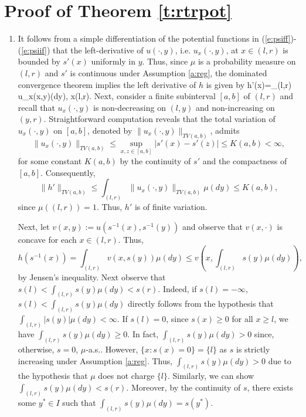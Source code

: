 \documentclass[11pt,reqno]{amsart}
\numberwithin{equation}{section}
\begin{document}
\section{Proof of Theorem \ref{t:rtrpot}}
	\begin{enumerate}[leftmargin=*]
		\item It follows from a simple differentiation of the potential functions in  (\ref{e:psiff})-(\ref{e:psiif}) that the left-derivative of $u(\cdot, y)$, i.e. $u_x(\cdot,y)$, at $x \in (l,r)$ is bounded by $s'(x)$ uniformly in $y$. Thus, since $\mu$ is a probability measure on $(l,r)$ and $s'$ is continuous under Assumption \ref{a:reg}, the dominated convergence theorem implies the left derivative of $h$ is given by
		\be \label{e:h'potential}
		h'(x)=\int_{(l,r)} u_x(x,y)\mu(dy), \qquad x\in (l,r).
		\ee
		Next, consider a finite subinterval $[a,b]$ of $(l,r)$ and recall that $u_x(\cdot,y)$ is non-decreasing on $(l,y)$ and non-increasing on $(y,r)$. Straightforward computation reveals that  the total variation of  $u_x(\cdot,y)$ on $[a,b]$, denoted by 	$\|u_x(\cdot,y)\|_{TV(a,b)}$, admits
		\[
		\|u_x(\cdot,y)\|_{TV(a,b)}\leq \sup_{x,z \in [a,b]}|s'(x)-s'(z)|\leq K(a,b)<\infty,
		\]
		for some constant $K(a,b)$ by the continuity of $s'$ and the compactness of $[a,b]$. Consequently,
		\[
		\|h'\|_{TV(a,b)}\leq \int_{(l,r)}\|u_x(\cdot,y)\|_{TV(a,b)}\mu(dy)\leq K(a,b),
		\]
		since $\mu((l,r))=1$. Thus, $h'$ is of finite variation. 
		
		Next, let $v(x,y):=u(s^{-1}(x), s^{-1}(y))$ and observe that $v(x,\cdot)$ is concave for each $x \in (l,r)$. Thus,
		\[
		h(s^{-1}(x))=\int_{(l,r)} v(x, s(y))\mu(dy)\leq v\left(x,\int_{(l,r)} s(y)\mu(dy)\right),
		\] 
		by Jensen's inequality. Next observe  that $s(l)<\int_{(l,r)} s(y)\mu(dy)<s(r)$.  Indeed, if $s(l)=-\infty$, $s(l)< \int_{(l,r)}s(y)\mu(dy)$ directly follows from the hypothesis that $\int_{(l,r)} |s(y)|\mu(dy)<\infty$.  If $s(l)=0$, since $s(x)\geq 0$ for all $x\geq l$, we have $\int_{(l,r)}s(y)\mu(dy)\geq 0$. In fact, $\int_{(l,r)}s(y)\mu(dy)>0$ since, otherwise, $s=0$, $\mu$-a.s.. However,  $\{x:s(x)=0\}=\{l\}$ as $s$ is strictly increasing under Assumption \ref{a:reg}. Thus, $\int_{(l,r)} s(y)\mu(dy)>0$ due to the hypothesis that $\mu$ does not charge $\{l\}$. Similarly, we can show $\int_{(l,r)}s(y)\mu(dy)<s(r)$.  Moreover, by the continuity of $s$, there exists  some $y^* \in I$  such that $\int_{(l,r)} s(y)\mu(dy)=s(y^*)$. 
		

\end{enumerate}
\end{document}
